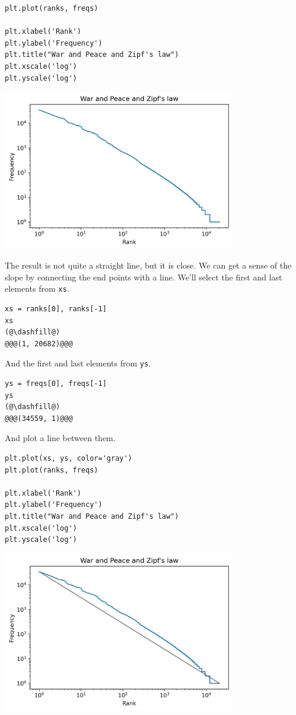 \begin{lstlisting}[]
plt.plot(ranks, freqs)

plt.xlabel('Rank')
plt.ylabel('Frequency')
plt.title("War and Peace and Zipf's law")
plt.xscale('log')
plt.yscale('log')
\end{lstlisting}

\begin{center}
\includegraphics[width=4in]{chapters/06_plotting_files/06_plotting_78_0.png}
\end{center}

The result is not quite a straight line, but it is close. We can get a
sense of the slope by connecting the end points with a line. We'll
select the first and last elements from \passthrough{\lstinline!xs!}.

\begin{lstlisting}[]
xs = ranks[0], ranks[-1]
xs
(@\dashfill@)
@@@(1, 20682)@@@
\end{lstlisting}

And the first and last elements from \passthrough{\lstinline!ys!}.

\begin{lstlisting}[]
ys = freqs[0], freqs[-1]
ys
(@\dashfill@)
@@@(34559, 1)@@@
\end{lstlisting}

And plot a line between them.

\begin{lstlisting}[]
plt.plot(xs, ys, color='gray')
plt.plot(ranks, freqs)

plt.xlabel('Rank')
plt.ylabel('Frequency')
plt.title("War and Peace and Zipf's law")
plt.xscale('log')
plt.yscale('log')
\end{lstlisting}

\begin{center}
\includegraphics[width=4in]{chapters/06_plotting_files/06_plotting_84_0.png}
\end{center}

